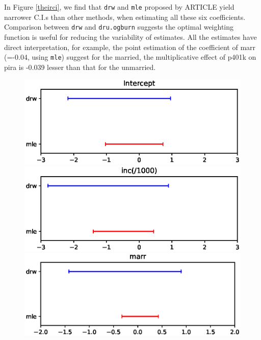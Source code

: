 \documentclass{article}
\begin{document}
In Figure \ref*{theirci}, we find that \texttt{drw} and \texttt{mle} proposed by ARTICLE yield narrower C.I.s than other methods, when estimating all these six coefficients. Comparison between \texttt{drw} and \texttt{dru.ogburn} suggests the optimal weighting function is useful for reducing the variability of estimates. All the estimates have direct interpretation, for example, the point estimation of the coefficient of marr (=-0.04, using \texttt{mle}) suggest for the married, the multiplicative effect of p401k on pira is -0.039 lesser than that for the unmarried.
\begin{figure}
\centering
\begin{minipage}{0.48\linewidth}
\includegraphics[width=\linewidth]{0.eps}
\end{minipage}
\begin{minipage}{0.48\linewidth}
\includegraphics[width=\linewidth]{1.eps}
\end{minipage}
\begin{minipage}{0.48\linewidth}
\includegraphics[width=\linewidth]{2.eps}

\end{minipage}
\end{figure}
\end{document}
